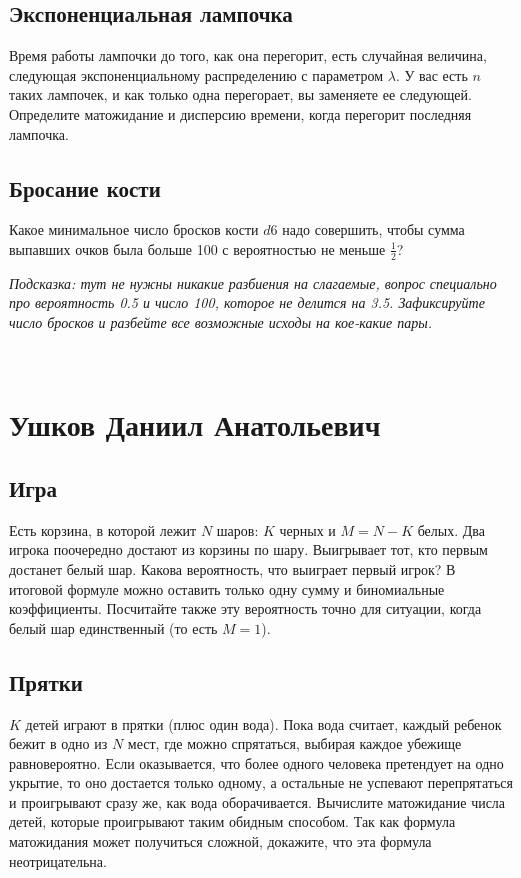 \documentclass[12pt]{article}
\begin{document}
\subsection{Экспоненциальная лампочка}
Время работы лампочки до того, как она перегорит, есть случайная величина, следующая экспоненциальному распределению с параметром $\lambda$. У вас есть $n$ таких лампочек, и как только одна перегорает, вы заменяете ее следующей. Определите матожидание и дисперсию времени, когда перегорит последняя лампочка.

\subsection{Бросание кости}
Какое минимальное число бросков кости $d6$ надо совершить, чтобы сумма выпавших очков была больше 100 с вероятностью не меньше $\frac{1}{2}$? 

\emph{Подсказка: тут не нужны никакие разбиения на слагаемые, вопрос специально про вероятность 0.5 и число 100, которое не делится на 3.5. Зафиксируйте число бросков и разбейте все возможные исходы на кое-какие пары.}

\newpage
~
\newpage
\section{Ушков Даниил Анатольевич}

\subsection{Игра}
Есть корзина, в которой лежит $N$ шаров: $K$ черных и $M = N - K$ белых. Два игрока поочередно достают из корзины по шару. Выигрывает тот, кто первым достанет белый шар. Какова вероятность, что выиграет первый игрок? В итоговой формуле можно оставить только одну сумму и биномиальные коэффициенты. Посчитайте также эту вероятность точно для ситуации, когда белый шар единственный (то есть $M = 1$).

\subsection{Прятки}
$K$ детей играют в прятки (плюс один вода). Пока вода считает, каждый ребенок бежит в одно из $N$ мест, где можно спрятаться, выбирая каждое убежище равновероятно. Если оказывается, что более одного человека претендует на одно укрытие, то оно достается только одному, а остальные не успевают перепрятаться и проигрывают сразу же, как вода оборачивается. Вычислите матожидание числа детей, которые проигрывают таким обидным способом. Так как формула матожидания может получиться сложной, докажите, что эта формула неотрицательна.
\end{document}
